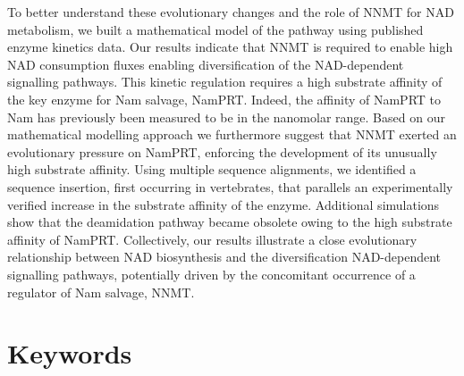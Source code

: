 To better understand these evolutionary changes and the role of NNMT for NAD metabolism, we built a mathematical model of the pathway using published enzyme kinetics data. Our results indicate that NNMT is required to enable high NAD consumption fluxes enabling diversification of the NAD-dependent signalling pathways. This kinetic regulation requires a high substrate affinity of the key enzyme for Nam salvage, NamPRT. Indeed, the affinity of NamPRT to Nam has previously been measured to be in the nanomolar range. Based on our mathematical modelling approach we furthermore suggest that NNMT exerted an evolutionary pressure on NamPRT, enforcing the development of its unusually high substrate affinity. Using multiple sequence alignments, we identified a sequence insertion, first occurring in vertebrates, that parallels an experimentally verified increase in the substrate affinity of the enzyme. Additional simulations show that the deamidation pathway became obsolete owing to the high substrate affinity of NamPRT. Collectively, our results illustrate a close evolutionary relationship between NAD biosynthesis and the diversification NAD-dependent signalling pathways, potentially driven by the concomitant occurrence of a regulator of Nam salvage, NNMT.


\section*{Keywords}
